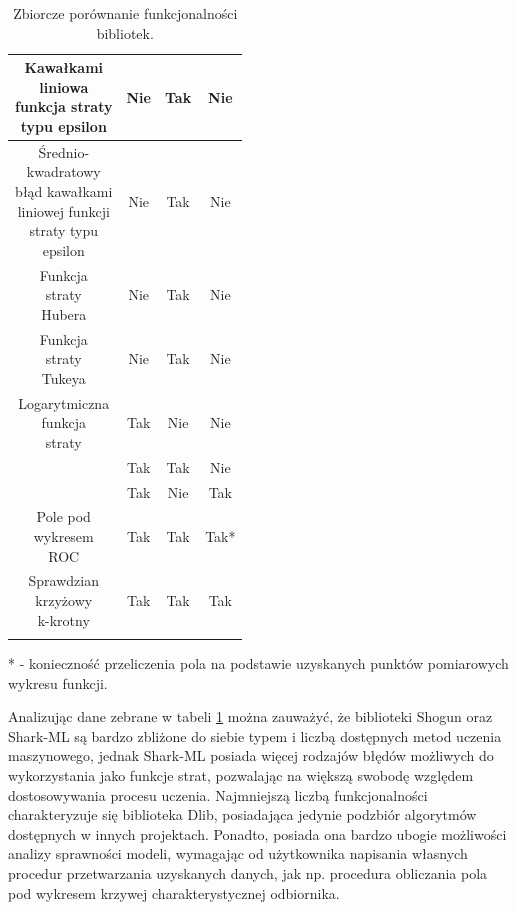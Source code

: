 \begin{longtable}{c | c | c | c}
	\hline
	\makecell{Kawałkami \\ liniowa \\ funkcja straty \\ typu epsilon} & Nie & Tak & Nie\\
	\hline
	\makecell{Średnio-\\kwadratowy \\ błąd kawałkami \\ liniowej funkcji \\ straty typu \\ epsilon} & Nie & Tak & Nie\\
	\hline
	\makecell{Funkcja \\ straty \\ Hubera} & Nie & Tak & Nie\\
	\hline
	\makecell{Funkcja \\ straty \\ Tukeya} & Nie & Tak & Nie\\
	\hline
	\makecell{Logarytmiczna \\ funkcja \\ straty} & Tak & Nie & Nie\\
	\hline
	\makecell{Metryka $R^2$} & Tak & Tak & Nie\\
	\hline
	\makecell{Dokładność} & Tak & Nie & Tak \\
	\hline
	\makecell{Pole pod \\ wykresem \\ ROC} & Tak & Tak & Tak* \\
	\hline
	\makecell{Sprawdzian \\ krzyżowy \\ k-krotny} & Tak & Tak & Tak \\
	\caption{Zbiorcze porównanie funkcjonalności bibliotek.}
	\label{fun:sum}
\end{longtable} 

* - konieczność przeliczenia pola na podstawie uzyskanych punktów pomiarowych wykresu funkcji.

Analizując dane zebrane w tabeli \ref{fun:sum} można zauważyć, że biblioteki Shogun oraz Shark-ML są bardzo zbliżone do siebie typem i liczbą dostępnych metod uczenia maszynowego, jednak Shark-ML posiada więcej rodzajów błędów możliwych do wykorzystania jako funkcje strat, pozwalając na większą swobodę względem dostosowywania procesu uczenia. Najmniejszą liczbą funkcjonalności charakteryzuje się biblioteka Dlib, posiadająca jedynie podzbiór algorytmów dostępnych w innych projektach. Ponadto, posiada ona bardzo ubogie możliwości analizy sprawności modeli, wymagając od użytkownika napisania własnych procedur przetwarzania uzyskanych danych, jak np. procedura obliczania pola pod wykresem krzywej charakterystycznej odbiornika.

